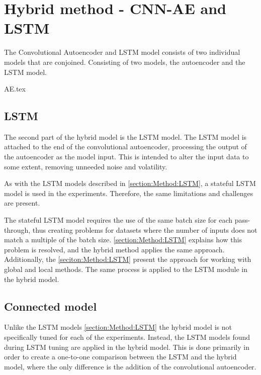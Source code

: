 
\section{Hybrid method - CNN-AE and LSTM}
\label{section:Method:CNN-AE-LSTM}


The Convolutional Autoencoder and LSTM model consists of two individual models that are conjoined.
Consisting of two models,
the autoencoder and the LSTM model.


{AE.tex}


\subsection{LSTM}

The second part of the hybrid model is the LSTM model.
The LSTM model is attached to the end of the convolutional autoencoder,
processing the output of the autoencoder as the model input.
This is intended to alter the input data to some extent, removing unneeded noise and volatility.

As with the LSTM models described in \cref{section:Method:LSTM}, a stateful LSTM model is used in the experiments.
Therefore, the same limitations and challenges are present.

The stateful LSTM model requires the use of the same batch size for each pass-through, thus creating problems for datasets where the number
of inputs does not match a multiple of the batch size.
\cref{section:Method:LSTM} explains how this problem is resolved, and the hybrid method applies the same approach.
Additionally,
the \cref{seciton:Method:LSTM} present the approach for working with global and local methods.
The same process is applied to the LSTM module in the hybrid model.


\subsection{Connected model}

Unlike the LSTM models \cref{section:Method:LSTM} the hybrid model is not specifically tuned for each of the experiments.
Instead, the LSTM models found during LSTM tuning are applied in the hybrid model.
This is done primarily in order to create a one-to-one comparison between the LSTM and the hybrid model,
where the only difference is the addition of the convolutional autoencoder.






